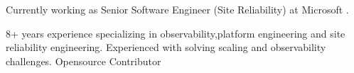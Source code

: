

\begin{cvparagraph}

Currently working as Senior Software Engineer (Site Reliability) at Microsoft .

 8+ years experience specializing in observability,platform engineering and site reliability engineering.
 Experienced with solving scaling and observability challenges.
 Opensource Contributor
\end{cvparagraph}
